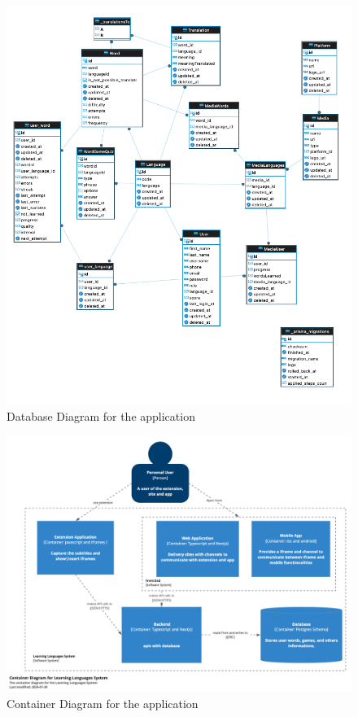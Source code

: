 \documentclass[12pt]{article}
\begin{document}
\begin{figure}[!h]
  \centering
  \caption{
  Database Diagram for the application
  }
  \label{fig:database_diagram}
  \includegraphics[width=1\textwidth]{assets/23.png}
\end{figure}



\begin{figure}[!h]
  \centering
  \caption{
    Container Diagram for the application
  }
  \label{fig:container_diagram}
  \includegraphics[width=1\textwidth]{assets/24.png}
\end{figure}
\end{document}
